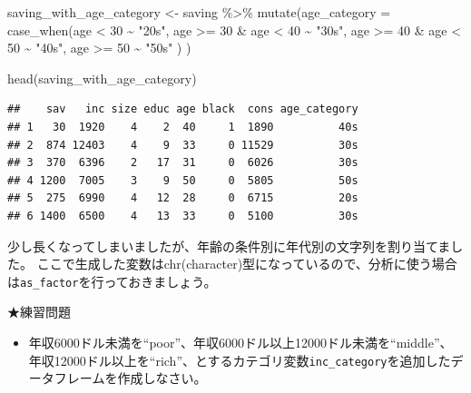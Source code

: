 \documentclass[
]{book}
\newenvironment{Shaded}{\begin{snugshade}}{\end{snugshade}}
\newcommand{\AttributeTok}[1]{\textcolor[rgb]{0.77,0.63,0.00}{#1}}
\newcommand{\DecValTok}[1]{\textcolor[rgb]{0.00,0.00,0.81}{#1}}
\newcommand{\FunctionTok}[1]{\textcolor[rgb]{0.00,0.00,0.00}{#1}}
\newcommand{\NormalTok}[1]{#1}
\newcommand{\OtherTok}[1]{\textcolor[rgb]{0.56,0.35,0.01}{#1}}
\newcommand{\SpecialCharTok}[1]{\textcolor[rgb]{0.00,0.00,0.00}{#1}}
\newcommand{\StringTok}[1]{\textcolor[rgb]{0.31,0.60,0.02}{#1}}
\providecommand{\tightlist}{%
  \setlength{\itemsep}{0pt}\setlength{\parskip}{0pt}}
\begin{document}
\begin{Shaded}
\begin{Highlighting}[]
\NormalTok{saving\_with\_age\_category }\OtherTok{\textless{}{-}}
\NormalTok{  saving }\SpecialCharTok{\%\textgreater{}\%}
    \FunctionTok{mutate}\NormalTok{(}\AttributeTok{age\_category =} \FunctionTok{case\_when}\NormalTok{(age }\SpecialCharTok{\textless{}} \DecValTok{30} \SpecialCharTok{\textasciitilde{}} \StringTok{"20s"}\NormalTok{,}
\NormalTok{                                    age }\SpecialCharTok{\textgreater{}=} \DecValTok{30} \SpecialCharTok{\&}\NormalTok{ age }\SpecialCharTok{\textless{}} \DecValTok{40} \SpecialCharTok{\textasciitilde{}} \StringTok{"30s"}\NormalTok{,}
\NormalTok{                                    age }\SpecialCharTok{\textgreater{}=} \DecValTok{40} \SpecialCharTok{\&}\NormalTok{ age }\SpecialCharTok{\textless{}} \DecValTok{50} \SpecialCharTok{\textasciitilde{}} \StringTok{"40s"}\NormalTok{,}
\NormalTok{                                    age }\SpecialCharTok{\textgreater{}=} \DecValTok{50} \SpecialCharTok{\textasciitilde{}} \StringTok{"50s"}
\NormalTok{                                    )}
\NormalTok{          )}

\FunctionTok{head}\NormalTok{(saving\_with\_age\_category)}
\end{Highlighting}
\end{Shaded}

\begin{verbatim}
##    sav   inc size educ age black  cons age_category
## 1   30  1920    4    2  40     1  1890          40s
## 2  874 12403    4    9  33     0 11529          30s
## 3  370  6396    2   17  31     0  6026          30s
## 4 1200  7005    3    9  50     0  5805          50s
## 5  275  6990    4   12  28     0  6715          20s
## 6 1400  6500    4   13  33     0  5100          30s
\end{verbatim}

少し長くなってしまいましたが、年齢の条件別に年代別の文字列を割り当てました。
ここで生成した変数はchr(character)型になっているので、分析に使う場合は\texttt{as\_factor}を行っておきましょう。

★練習問題

\begin{itemize}
\tightlist
\item
  年収6000ドル未満を``poor''、年収6000ドル以上12000ドル未満を``middle''、 年収12000ドル以上を``rich''、とするカテゴリ変数\texttt{inc\_category}を追加したデータフレームを作成しなさい。
\end{itemize}
\end{document}
